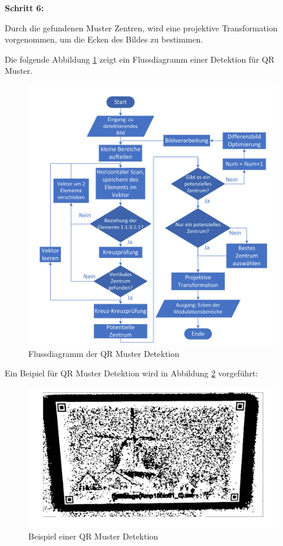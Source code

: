 \textbf{Schritt 6:}

Durch die gefundenen Muster Zentren, wird eine projektive Transformation vorgenommen, um die Ecken des Bildes zu bestimmen.


Die folgende Abbildung \ref{fig:FlussdiagrammQRMuster} zeigt ein Flussdiagramm einer Detektion für QR Muster.

\begin{figure}[htb]
 \centering 
 \includegraphics[keepaspectratio,width=1.0\textwidth]{images/3_Ersteverfahren/QRMuster/QR_flussdiagramm.pdf}
 \caption{Flussdiagramm der QR Muster Detektion}
 \label{fig:FlussdiagrammQRMuster}
\end{figure}

Ein Beipiel für QR Muster Detektion wird in Abbildung \ref{fig:QRMusterBeispiel} vorgeführt:

\begin{figure}[htb]
 \centering 
 \includegraphics[keepaspectratio,width=1.0\textwidth]{images/3_Ersteverfahren/QRMuster/QR_Patterndetektion.pdf}
 \caption{Beispiel einer QR Muster Detektion}
 \label{fig:QRMusterBeispiel}
\end{figure}